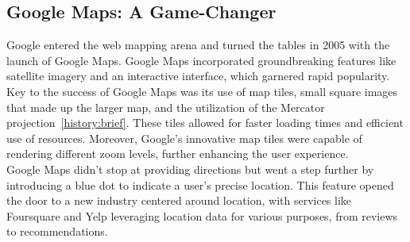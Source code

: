 \documentclass[10pt,oneside,english,a4paper]{article}
\begin{document}
\subsection{Google Maps: A Game-Changer} \label{history:gamechanger}
Google entered the web mapping arena and turned the tables in 2005 with the launch of Google Maps. Google Maps incorporated groundbreaking features like satellite imagery and an interactive interface, which garnered rapid popularity. 
\\Key to the success of Google Maps was its use of map tiles, small square images that made up the larger map, and the utilization of the Mercator projection~\ref{history:brief}. These tiles allowed for faster loading times and efficient use of resources. Moreover, Google's innovative map tiles were capable of rendering different zoom levels, further enhancing the user experience. %
\\Google Maps didn't stop at providing directions but went a step further by introducing a blue dot to indicate a user's precise location. This feature opened the door to a new industry centered around location, with services like Foursquare and Yelp leveraging location data for various purposes, from reviews to recommendations.
\end{document}
